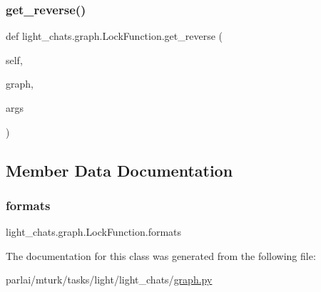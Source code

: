 \mbox{\label{classlight__chats_1_1graph_1_1LockFunction_a90dd7a90a271b6d2f27b17f6796daa91}} 
\subsubsection{\texorpdfstring{get\+\_\+reverse()}{get\_reverse()}}
{\footnotesize\ttfamily def light\+\_\+chats.\+graph.\+Lock\+Function.\+get\+\_\+reverse (\begin{DoxyParamCaption}\item[{}]{self,  }\item[{}]{graph,  }\item[{}]{args }\end{DoxyParamCaption})}



\subsection{Member Data Documentation}
\mbox{\label{classlight__chats_1_1graph_1_1LockFunction_a5a4e9e70cf33889e84cc3d713cb3a270}} 
\subsubsection{\texorpdfstring{formats}{formats}}
{\footnotesize\ttfamily light\+\_\+chats.\+graph.\+Lock\+Function.\+formats}



The documentation for this class was generated from the following file\+:\begin{DoxyCompactItemize}
\item 
parlai/mturk/tasks/light/light\+\_\+chats/\hyperlink{parlai_2mturk_2tasks_2light_2light__chats_2graph_8py}{graph.\+py}\end{DoxyCompactItemize}

